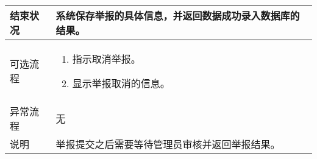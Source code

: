 \begin{table}[htbp]
\begin{tabular}{|l|l|l|l|}
        \hline
        结束状况                          & \multicolumn{3}{l|}{系统保存举报的具体信息，并返回数据成功录入数据库的结果。    }                                                                                                                                    \\
        \hline
        可选流程                          & \multicolumn{3}{l|}{\begin{minipage}[t]{0.8\textwidth}
                \begin{enumerate}[nosep]
                    \item 指示取消举报。
                    \item 显示举报取消的信息。
                          \vspace{0.5em}
                \end{enumerate}
            \end{minipage}  }                                                                                                                                                                    \\
        \hline
        异常流程                          & \multicolumn{3}{l|}{   无}                                                                                                                                                                                           \\
        \hline
        说明                              & \multicolumn{3}{l|}{举报提交之后需要等待管理员审核并返回举报结果。    }                                                                                                                                              \\
        \hline
    \end{tabular}
\end{table}

